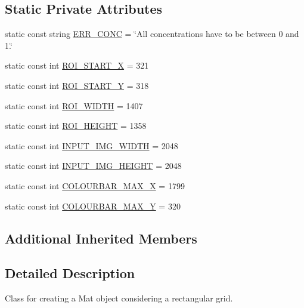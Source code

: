 \subsection*{Static Private Attributes}
\begin{DoxyCompactItemize}
\item 
static const string \hyperlink{classmultiscale_1_1analysis_1_1RectangularMatFactory_a43300d891b115e25dfa33507c74cb8ab}{E\-R\-R\-\_\-\-C\-O\-N\-C} = \char`\"{}All concentrations have to be between 0 and 1.\char`\"{}
\item 
static const int \hyperlink{classmultiscale_1_1analysis_1_1RectangularMatFactory_a90e622e964218af93ca0d024dc3faa41}{R\-O\-I\-\_\-\-S\-T\-A\-R\-T\-\_\-\-X} = 321
\item 
static const int \hyperlink{classmultiscale_1_1analysis_1_1RectangularMatFactory_a1a25934dba59fe883d88e9735eb33db6}{R\-O\-I\-\_\-\-S\-T\-A\-R\-T\-\_\-\-Y} = 318
\item 
static const int \hyperlink{classmultiscale_1_1analysis_1_1RectangularMatFactory_aeb6f19ae65802df5f876cd0e15b27a48}{R\-O\-I\-\_\-\-W\-I\-D\-T\-H} = 1407
\item 
static const int \hyperlink{classmultiscale_1_1analysis_1_1RectangularMatFactory_a66855a873613668d15773b85efea9829}{R\-O\-I\-\_\-\-H\-E\-I\-G\-H\-T} = 1358
\item 
static const int \hyperlink{classmultiscale_1_1analysis_1_1RectangularMatFactory_ae933a387b469afd8f7225641655cebb0}{I\-N\-P\-U\-T\-\_\-\-I\-M\-G\-\_\-\-W\-I\-D\-T\-H} = 2048
\item 
static const int \hyperlink{classmultiscale_1_1analysis_1_1RectangularMatFactory_a5049341e062acc91027386befc8814be}{I\-N\-P\-U\-T\-\_\-\-I\-M\-G\-\_\-\-H\-E\-I\-G\-H\-T} = 2048
\item 
static const int \hyperlink{classmultiscale_1_1analysis_1_1RectangularMatFactory_a9a91307705bb2d4cc8e837718ce330a8}{C\-O\-L\-O\-U\-R\-B\-A\-R\-\_\-\-M\-A\-X\-\_\-\-X} = 1799
\item 
static const int \hyperlink{classmultiscale_1_1analysis_1_1RectangularMatFactory_a5a9cd4ea96ec3c9bddcf610d397d187a}{C\-O\-L\-O\-U\-R\-B\-A\-R\-\_\-\-M\-A\-X\-\_\-\-Y} = 320
\end{DoxyCompactItemize}
\subsection*{Additional Inherited Members}


\subsection{Detailed Description}
Class for creating a Mat object considering a rectangular grid. 

